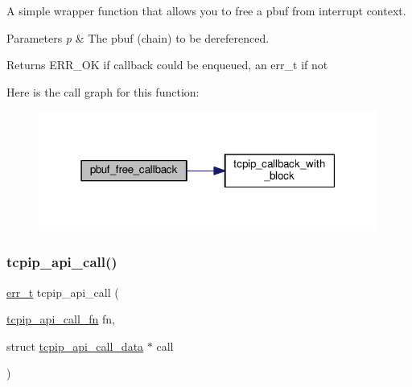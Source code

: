 A simple wrapper function that allows you to free a pbuf from interrupt context.


\begin{DoxyParams}{Parameters}
{\em p} & The pbuf (chain) to be dereferenced. \\
\hline
\end{DoxyParams}
\begin{DoxyReturn}{Returns}
E\+R\+R\+\_\+\+OK if callback could be enqueued, an err\+\_\+t if not 
\end{DoxyReturn}
Here is the call graph for this function\+:
\nopagebreak
\begin{figure}[H]
\begin{center}
\leavevmode
\includegraphics[width=316pt]{openmote-cc2538_2lwip_2src_2api_2tcpip_8c_a5cdcb6b784fe0e8736a5b31a5cfbed6c_cgraph}
\end{center}
\end{figure}
\mbox{\label{openmote-cc2538_2lwip_2src_2api_2tcpip_8c_a3d42b0c46607f91aedcc7745ed466b08}} 
\subsubsection{\texorpdfstring{tcpip\+\_\+api\+\_\+call()}{tcpip\_api\_call()}}
{\footnotesize\ttfamily \hyperlink{group__infrastructure__errors_gaf02d9da80fd66b4f986d2c53d7231ddb}{err\+\_\+t} tcpip\+\_\+api\+\_\+call (\begin{DoxyParamCaption}\item[{\hyperlink{openmote-cc2538_2lwip_2src_2include_2lwip_2priv_2tcpip__priv_8h_aa7ecde8c8d8012fe5c498f7ee58f9458}{tcpip\+\_\+api\+\_\+call\+\_\+fn}}]{fn,  }\item[{struct \hyperlink{structtcpip__api__call__data}{tcpip\+\_\+api\+\_\+call\+\_\+data} $\ast$}]{call }\end{DoxyParamCaption})}

